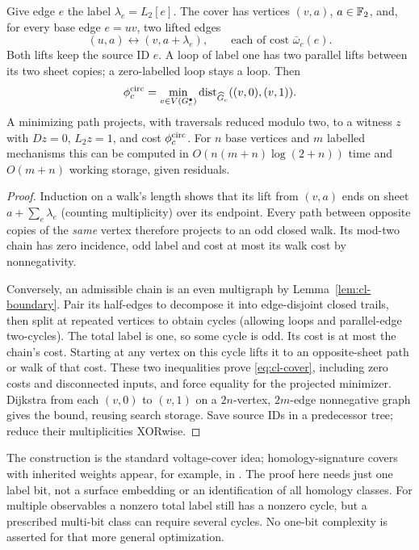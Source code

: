 \begin{theorem}\label{thm:cl-cover}
Give edge $e$ the label $\lambda_e=L_2[e]$. The cover has vertices $(v,a)$,
$a\in\mathbb F_2$, and, for every base edge $e=uv$, two lifted edges
\[
 (u,a)\longleftrightarrow(v,a+\lambda_e),
 \qquad\text{each of cost }\bar\omega_c(e).
\]
Both lifts keep the source ID $e$. A loop of label one has two parallel
lifts between its two sheet copies; a zero-labelled loop stays a loop.
Then
\begin{equation}
 \phi_c^{\rm circ}
 =\min_{v\in V(G_c^\bullet)}
     \operatorname{dist}_{\widehat G_c}((v,0),(v,1)).
 \label{eq:cl-cover}
\end{equation}
A minimizing path projects, with traversals reduced modulo two, to a
witness $z$ with $Dz=0$, $L_2z=1$, and cost $\phi_c^{\rm circ}$.
For $n$ base vertices and $m$ labelled mechanisms this can be computed
in $O(n(m+n)\log(2+n))$ time and $O(m+n)$ working storage, given residuals.
\end{theorem}
\begin{proof}
Induction on a walk's length shows that its lift from $(v,a)$ ends on
sheet $a+\sum_e\lambda_e$ (counting multiplicity) over its endpoint.
Every path between opposite copies of the \emph{same} vertex therefore
projects to an odd closed walk. Its mod-two chain has zero incidence,
odd label and cost at most its walk cost by nonnegativity.

Conversely, an admissible chain is an even multigraph by
Lemma~\ref{lem:cl-boundary}. Pair its half-edges to decompose it into
edge-disjoint closed trails, then split at repeated vertices to obtain
cycles (allowing loops and parallel-edge two-cycles). The total label is
one, so some cycle is odd. Its cost is at most the chain's cost. Starting
at any vertex on this cycle lifts it to an opposite-sheet path or walk
of that cost. These two inequalities prove \eqref{eq:cl-cover}, including
zero costs and disconnected inputs, and force equality for the projected
minimizer. Dijkstra from each $(v,0)$ to $(v,1)$ on a $2n$-vertex,
$2m$-edge nonnegative graph gives the bound, reusing search storage.
Save source IDs in a predecessor tree; reduce their multiplicities XORwise.
\end{proof}
The construction is the standard voltage-cover idea; homology-signature
covers with inherited weights appear, for example, in
\cite[Sec.~5.1]{HomologyCovers}. The proof here needs just one label bit,
not a surface embedding or an identification of all homology classes.
For multiple observables a nonzero total label still has a nonzero cycle,
but a prescribed multi-bit class can require several cycles. No one-bit
complexity is asserted for that more general optimization.

